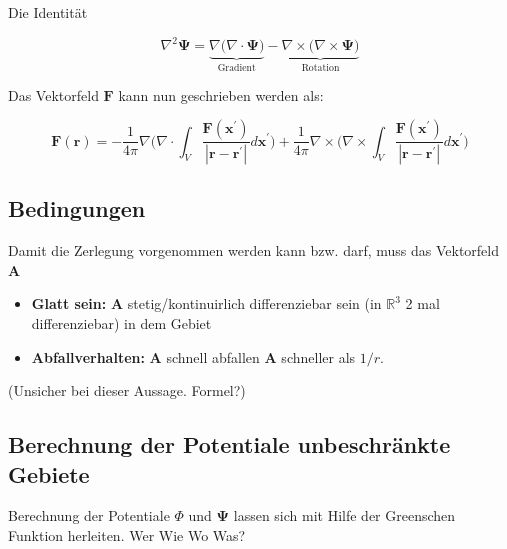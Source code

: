 Die Identität

\begin{equation}
\nabla^2 \mathbf{\Psi}= \underbrace{\nabla \Big( \nabla \cdot \mathbf{\Psi} \Big)}_{\text{Gradient}} -\underbrace{\nabla \times \Big(\nabla \times \mathbf{\Psi} \Big)}_{\text{Rotation}}
\end{equation}

Das Vektorfeld $\mathbf{F}$ kann nun geschrieben werden als:

\begin{equation}
\mathbf{F}(\mathbf{r}) = - \frac{1}{4 \pi} \nabla \bigg( \nabla \cdot \int_V \frac{\mathbf{F}(\mathbf{x}^{\prime})}{|\mathbf{r} - \mathbf{r}^{\prime}|} d\mathbf{x}^{\prime} \bigg) + \frac{1}{4 \pi} \nabla \times \bigg( \nabla \times \int_V \frac{\mathbf{F}(\mathbf{x}^{\prime})}{|\mathbf{r} - \mathbf{r}^{\prime}|} d\mathbf{x}^{\prime} \bigg)
\end{equation}


\subsection{Bedingungen
\label{helmholtz:subsection:Bedingung}}

Damit die Zerlegung vorgenommen werden kann bzw. darf, muss das Vektorfeld $\mathbf{A}$ 

\begin{itemize}
\item \textbf{Glatt sein:} $\mathbf{A}$ stetig/kontinuirlich differenziebar sein (in $\mathbb{R}^3$ 2 mal differenziebar) in dem Gebiet
\item \textbf{Abfallverhalten:} $\mathbf{A}$ schnell abfallen  $\mathbf{A}$ schneller als $1/r$. 
\end{itemize}
(Unsicher bei dieser Aussage. Formel?)


\subsection{Berechnung der Potentiale unbeschränkte Gebiete
\label{helmholtz:subsection:Berechnung}}


Berechnung der Potentiale $\Phi $ und $\mathbf{\Psi}$ lassen sich mit Hilfe der Greenschen Funktion herleiten. Wer Wie Wo Was?


